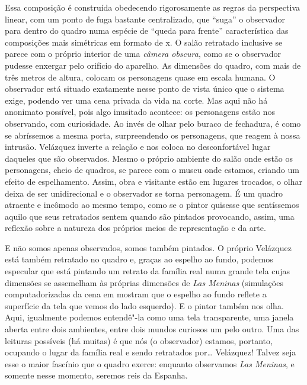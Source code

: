 Essa composição é construída obedecendo rigorosamente as regras da
perspectiva linear, com um ponto de fuga bastante centralizado, que
``suga'' o observador para dentro do quadro numa espécie de ``queda para
frente'' característica das composições mais simétricas em formato de x.
O salão retratado inclusive se parece com o próprio interior de uma
\emph{câmera obscura}, como se o observador pudesse enxergar pelo
orifício do aparelho. As dimensões do quadro, com mais de três metros de
altura, colocam os personagens quase em escala humana. O observador está
situado exatamente nesse ponto de vista único que o sistema exige,
podendo ver uma cena privada da vida na corte. Mas aqui não há anonimato
possível, pois algo inusitado acontece: os personagens estão nos
observando, com curiosidade. Ao invés de olhar pelo buraco de fechadura,
é como se abríssemos a mesma porta, surpreendendo os personagens, que
reagem à nossa intrusão. Velázquez inverte a relação e nos coloca no
desconfortável lugar daqueles que são observados. Mesmo o próprio
ambiente do salão onde estão os personagens, cheio de quadros, se parece
com o museu onde estamos, criando um efeito de espelhamento. Assim, obra
e visitante estão em lugares trocados, o olhar deixa de ser
unidirecional e o observador se torna personagem. É um quadro atraente e
incômodo ao mesmo tempo, como se o pintor quisesse que sentíssemos
aquilo que seus retratados sentem quando são pintados provocando, assim,
uma reflexão sobre a natureza dos próprios meios de representação e da
arte.

E não somos apenas observados, somos também pintados. O próprio
Velázquez está também retratado no quadro e, graças ao espelho ao fundo,
podemos especular que está pintando um retrato da família real numa
grande tela cujas dimensões se assemelham às próprias dimensões de
\emph{Las Meninas} (simulações computadorizadas da cena em  mostram
que o espelho ao fundo reflete a superfície da tela que vemos do lado
esquerdo). E o pintor também nos olha. Aqui, igualmente podemos entendê"-la
como uma tela transparente, uma janela aberta entre dois ambientes,
entre dois mundos curiosos um pelo outro. Uma das leituras possíveis (há
muitas) é que nós (o observador) estamos, portanto, ocupando o lugar da
família real e sendo retratados por\ldots{} Velázquez! Talvez seja esse o
maior fascínio que o quadro exerce: enquanto observamos \emph{Las
Meninas}, e somente nesse momento, seremos reis da Espanha.

